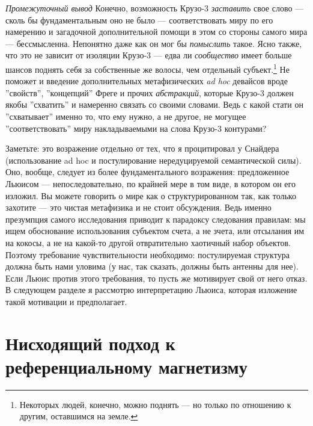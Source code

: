 \documentclass[11pt]{book}
\begin{document}
\textit{Промежуточный вывод} \quad Конечно, возможность Крузо-3 \textit{заставить} свое слово --- сколь бы фундаментальным оно не было --- соответствовать миру по его намерению и загадочной дополнительной помощи в этом со стороны самого мира --- бессмысленна. Непонятно даже как он мог бы \textit{помыслить} такое. Ясно также, что это не зависит от изоляции Крузо-3 --- едва ли \textit{сообщество} имеет больше шансов поднять себя за собственные же волосы, чем отдельный субъект.\footnote{Некоторых людей, конечно, можно поднять --- но только по отношению к другим, оставшимся на земле.} Не поможет и введение дополнительных метафизических \textit{ad hoc} девайсов вроде ''свойств'', ''концепций'' Фреге и прочих \textit{абстракций}, которые Крузо-3 должен якобы ''схватить'' и намеренно связать со своими словами. Ведь с какой стати он ''схватывает'' именно то, что ему нужно, а не другое, не могущее ''соответствовать'' миру накладываемыми на слова Крузо-3 контурами?

Заметьте: это возражение отдельно от тех, что я процитировал у Снайдера (использование ad hoc и постулирование нередуцируемой семантической силы). Оно, вообще, следует из более фундаментального возражения: предложенное Льюисом --- непоследовательно, по крайней мере в том виде, в котором он его изложил. Вы можете говорить о мире как о структурированном так, как только захотите --- это чистая метафизика и не стоит обсуждения. Ведь именно презумпция самого исследования приводит к парадоксу следования правилам: мы ищем обоснование использования субъектом счета, а не зчета, или отсылания им на кокосы, а не на какой-то другой отвратительно хаотичный набор объектов. Поэтому требование чувствительности необходимо: постулируемая структура должна быть нами уловима (у нас, так сказать, должны быть антенны для нее). Если Льюис против этого требования, то пусть же мотивирует свой от него отказ. В следующем разделе я рассмотрю интерпретацию Льюиса, которая изложение такой мотивации и предполагает.

\section{Нисходящий подход к референциальному магнетизму}
\end{document}
